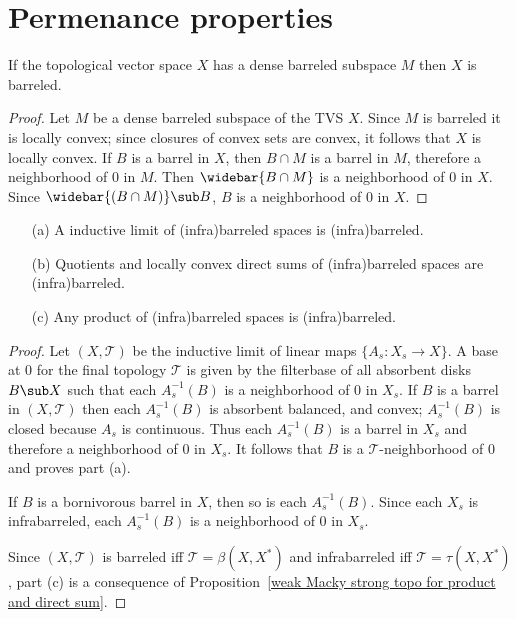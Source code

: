 \section{Permenance properties}
\begin{proposition}
If the topological vector space $X$ has a dense barreled subspace $M$ then $X$ is barreled.
\end{proposition}
\begin{proof}
Let $M$ be a dense barreled subspace of the TVS $X$. Since $M$ is barreled it is locally convex; since closures of convex sets are convex, it follows that $X$ is locally convex. If $B$ is a barrel in $X$, then $B\cap M$ is a barrel in $M$, therefore a neighborhood of $0$ in $M$. Then $\widebar{B\cap M}$ is a neighborhood of $0$ in $X$. Since $\widebar{(B\cap M)}\sub B$, $B$ is a neighborhood of $0$ in $X$.
\end{proof}
\begin{proposition}\label{LCS barreled space permanence}
\mbox{}
\begin{itemize}
\item[(a)] A inductive limit of (infra)barreled spaces is (infra)barreled.
\item[(b)] Quotients and locally convex direct sums of (infra)barreled spaces are (infra)barreled.
\item[(c)] Any product of (infra)barreled spaces is (infra)barreled.
\end{itemize}
\end{proposition}
\begin{proof}
Let $(X,\mathcal{T})$ be the inductive limit of linear maps $\{A_s:X_s\to X\}$. A base at $0$ for the final topology $\mathcal{T}$ is given by the filterbase of all absorbent disks $B\sub X$ such that each $A_s^{-1}(B)$ is a neighborhood of $0$ in $X_s$. If $B$ is a barrel in $(X,\mathcal{T})$ then each $A_s^{-1}(B)$ is absorbent balanced, and convex; $A_s^{-1}(B)$ is closed because $A_s$ is continuous. Thus each $A_s^{-1}(B)$ is a barrel in $X_s$ and therefore a neighborhood of $0$ in $X_s$. It follows that $B$ is a $\mathcal{T}$-neighborhood of $0$ and proves part (a).\par
If $B$ is a bornivorous barrel in $X$, then so is each $A_s^{-1}(B)$. Since each $X_s$ is infrabarreled, each $A_s^{-1}(B)$ is a neighborhood of $0$ in $X_s$.\par
Since $(X,\mathcal{T})$ is barreled iff $\mathcal{T}=\beta(X,X^*)$ and infrabarreled iff $\mathcal{T}=\tau(X,X^*)$, part (c) is a consequence of Proposition~\ref{weak Macky strong topo for product and direct sum}.
\end{proof}
